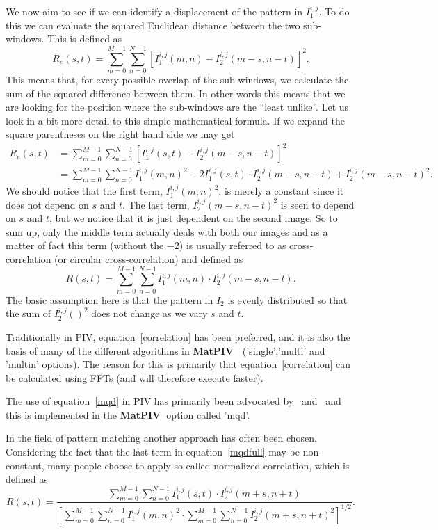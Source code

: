 \documentclass{book}
\newcommand{\matpiv}{{\bf MatPIV~}}
\begin{document}
We now aim to see if we can identify a displacement of the pattern in
$I_1^{i,j}$. To do this we can evaluate the squared Euclidean distance
between the two sub-windows. This is defined as
\[
R_e (s,t)=\sum_{m=0}^{M-1} \sum_{n=0}^{N-1} [I_1^{i,j}(m,n)-I_2^{i,j}(m-s,n-t)]^2.
\label{mqd}
\]
This means that, for every possible overlap of the sub-windows, we
calculate the sum of the squared difference between them. In other words
this means that we are looking for the position where the sub-windows
are the ``least unlike''. Let us look in a bit more detail to this
simple mathematical formula. If we expand the square parentheses on the
right hand side we may get
\begin{equation}
\begin{split}
R_e (s,t) &= \sum_{m=0}^{M-1} \sum_{n=0}^{N-1} [I_1^{i,j}(s,t)-I_2^{i,j}(m-s,n-t)]^2\\
       &= \sum_{m=0}^{M-1} \sum_{n=0}^{N-1} I_1^{i,j}(m,n)^2 -2 I_1^{i,j}(s,t) \cdot I_2^{i,j}(m-s,n-t) + I_2^{i,j}(m-s,n-t)^2.
\end{split}
\label{mqdfull}
\end{equation}
We should notice that the first term, $I_1^{i,j}(m,n)^2$, is merely a
constant since it does not depend on $s$ and $t$. The last term,
$I_2^{i,j}(m-s,n-t)^2$ is seen to depend on $s$ and $t$, but we notice
that it is just dependent on the second image. So to sum up, only the
middle term actually deals with both our images and as a matter of fact
this term (without the $-2$) is usually referred to as
cross-correlation (or circular cross-correlation) and defined as
\begin{equation}
R(s,t)=\sum_{m=0}^{M-1} \sum_{n=0}^{N-1} I_1^{i,j}(m,n) \cdot I_2^{i,j}(m-s,n-t).
\label{correlation}
\end{equation}
The basic assumption here is that the pattern in $I_2$ is evenly
distributed so that the sum of $I_2^{i,j} ()^2$ does not change as we
vary $s$ and $t$.

Traditionally in PIV, equation~\ref{correlation} has been preferred, and
it is also the basis of many of the different algorithms in \matpiv
('single','multi' and 'multin' options). The reason for this is
primarily that equation~\ref{correlation} can be calculated using FFTs
(and will therefore execute faster). 

The use of equation~\ref{mqd} in PIV has primarily been advocated
by~\cite{Gui:1996} and~\cite{Gui:2000} and this is implemented in the
\matpiv option called 'mqd'.

In the field of pattern matching another approach has often been chosen.
Considering the fact that the last term in equation~\ref{mqdfull} may be
non-constant, many people choose to apply so called normalized
correlation, which is defined as
\begin{equation}
R(s,t)=\frac{\sum_{m=0}^{M-1} \sum_{n=0}^{N-1} I_1^{i,j}(s,t) \cdot I_2^{i,j}(m+s,n+t)}{[\sum_{m=0}^{M-1} \sum_{n=0}^{N-1} I_1^{i,j}(m,n)^2\cdot \sum_{m=0}^{M-1} \sum_{n=0}^{N-1} I_2^{i,j}(m+s,n+t)^2]^{1/2}}.
\label{normcorr}
\end{equation}
\end{document}
